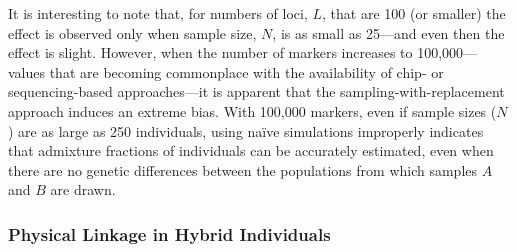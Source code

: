 {\begin{figure}
\caption[\biassimscap]{\biassimscap}
\label{fig:bias-sims}
\end{figure}
It is interesting to note
that, for numbers of loci,  $L$, that are 100 (or smaller) the effect is observed only when
sample size, $N$, is as small as 25---and even then the effect is slight.  However, when the
number of markers increases to 100,000---values that are becoming commonplace with the availability of chip-
or sequencing-based approaches---it is apparent that the sampling-with-replacement approach
induces an extreme bias.  With 100,000 markers, even if sample sizes ($N$) are as large as 250 individuals,
using na\"{i}ve simulations improperly indicates that admixture fractions of individuals can be
accurately estimated, even when there are no genetic differences between the populations from which
samples $A$ and $B$ are drawn.

\subsubsection*{Physical Linkage in Hybrid Individuals}

}
